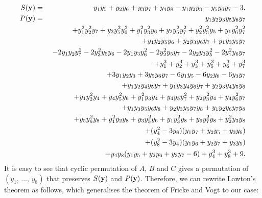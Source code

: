 \documentclass[11pt]{amsart}
\numberwithin{equation}{section}
\begin{document}
\begin{eqnarray}
\label{eq:S-y} S({\bf y}) & = & y_1y_5+y_2y_6+y_3y_7+y_4y_8 -y_1y_2y_3-y_5y_6y_7-3, \\
\label{eq:P-y}P({\bf y}) & = & y_1y_2y_3y_5y_6y_7 \\
\nonumber && \ 
+ y_1^2y_2^2y_7 + y_3y_5^2y_6^2
+y_1^2y_3^2y_6  + y_2y_5^2y_7^2
+y_2^2y_3^2y_5  + y_1y_6^2y_7^2 \\
\nonumber && \ 
+y_1y_2y_5y_6+y_2y_3y_6y_7+y_1y_3y_5y_7 \\
\nonumber && \ 
 -2y_1y_2y_7^2 - 2y_3^2y_5y_6
 -2y_1y_3y_6^2 - 2y_2^2y_5y_7
 -2 y_2y_3y_5^2 - 2 y_1^2y_6y_7 \\
 \nonumber && \ 
 +y_1^3+y_2^3+y_3^3+y_5^3+y_6^3+y_7^3 \\
 \nonumber && \ 
 + 3y_1y_2y_3+3y_5y_6y_7-6y_1y_5 -6y_2y_6 -6y_3y_7 \\
 \nonumber && \ 
 +y_1y_2y_4y_5y_7 + y_1y_3y_4y_6y_7 + y_2y_3y_4y_5y_6 \\
 \nonumber && \ 
 +y_1y_2^2y_4 + y_4y_5^2y_6 + y_1^2y_3y_4 + y_4y_5y_7^2+y_2y_3^2y_4+y_4y_6^2y_7 \\
 \nonumber &&  \ 
 +y_1y_3y_5y_6y_8 + y_2y_3y_5y_7y_8 + y_1y_2y_6y_7y_8 \\
 \nonumber && \ 
 +y_5y_6^2y_8 + y_1^2y_2y_8 + y_3y_5^2y_6+y_1y_3^2y_8 + y_6y_7^2y_8+y_2^2y_3y_8 \\
 \nonumber && \ 
 +(y_4^2-3y_8)(y_1y_7+y_2y_5+y_3y_6) \\
 \nonumber && \ 
 +(y_8^2-3y_4)(y_1y_6+y_2y_7+y_3y_5) \\
 \nonumber && \ 
 +y_4y_8(y_1y_5+y_2y_6+y_3y_7-6)+y_4^3+y_8^3+9.
\end{eqnarray}
It is easy to see that cyclic permutation of $A$, $B$ and $C$ gives a permutation of $(y_1,\,\ldots,\,y_8)$
that preserves $S({\bf y})$ and $P({\bf y})$. 
Therefore, we can rewrite Lawton's theorem as follows, which generalises the theorem of Fricke and Vogt to our case:
\end{document}

